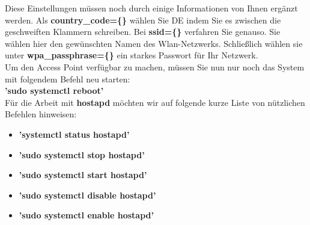 \noindent Diese Einstellungen müssen noch durch einige Informationen von Ihnen ergänzt werden. Als \textbf{country\_code=\{\}} wählen Sie \glqq DE\grqq{} indem Sie es zwischen die geschweiften Klammern schreiben. Bei \textbf{ssid=\{\}} verfahren Sie genauso. Sie wählen hier den gewünschten Namen des Wlan-Netzwerks. Schließlich wählen sie unter \textbf{wpa\_passphrase=\{\}} ein starkes Passwort für Ihr Netzwerk.\\

\noindent Um den Access Point verfügbar zu machen, müssen Sie nun nur noch das System mit folgendem Befehl neu starten:\\

\textbf{’sudo systemctl reboot’}\\

\noindent Für die Arbeit mit \textbf{hostapd} möchten wir auf folgende kurze Liste von nützlichen Befehlen hinweisen:\\

\begin{itemize}
    \item \textbf{’systemctl status hostapd’}
    \item \textbf{’sudo systemctl stop hostapd’}
    \item \textbf{’sudo systemctl start hostapd’}
    \item \textbf{’sudo systemctl disable hostapd’}
    \item \textbf{’sudo systemctl enable hostapd’}
\end{itemize}
